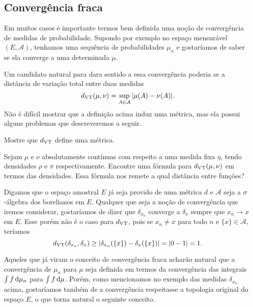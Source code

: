 \subsection{Convergência fraca}

Em muitos casos é importante termos bem definida uma noção de convergência de medidas de probabilidade.
Supondo por exemplo no espaço mensurável $(E,\mathcal{A})$, tenhamos uma sequência de probabilidades $\mu_n$ e gostaríamos de saber se ela converge a uma determinada $\mu$.

Um candidato natural para dara sentido a essa convergência poderia se a distância de variação total entre duas medidas
\begin{equation}
  d_{\operatorname{VT}}(\mu,\nu) = \sup_{A \in \mathcal{A}} |\mu(A) - \nu(A)|.
\end{equation}
Não é difícil mostrar que a definição acima induz uma métrica, mas ela possui alguns problemas que descreveremos a seguir.

\begin{exercise}
  Mostre que $d_{\operatorname{VT}}$ define uma métrica.
\end{exercise}

\begin{exercise}
  Sejam $\mu$ e $\nu$ absolutamente contínuas com respeito a uma medida fixa $\eta$, tendo densidades $\rho$ e $\pi$ respectivamente.
  Encontre uma fórmula para $d_{\operatorname{VT}}(\mu, \nu)$ em termos das densidades.
  Essa fórmula nos remete a qual distância entre funções?
\end{exercise}

Digamos que o espaço amostral $E$ já seja provido de uma métrica $d$ e $\mathcal{A}$ seja a $\sigma$-álgebra dos borelianos em $E$.
Qualquer que seja a noção de convergência que iremos considerar, gostaríamos de dizer que $\delta_{x_n}$ converge a $\delta_x$ sempre que $x_n \to x$ em $E$.
Esse porém não é o caso para $d_{\operatorname{VT}}$, pois se $x_n \neq x$ para todo $n$ e $\{x\} \in \mathcal{A}$, teríamos
\begin{equation}
  d_{\operatorname{VT}}(\delta_{x_n}, \delta_x) \geq |\delta_{x_n}(\{x\}) - \delta_{x}(\{x\}) | = |0 - 1| = 1.
\end{equation}

Aqueles que já viram o conceito de convergência fraca acharão natural que a convergência de $\mu_n$ para $\mu$ seja definida em termos da convergência das integrais $\int f \mathop{}\!\mathrm{d} \mu_n$ para $\int f \mathop{}\!\mathrm{d} \mu$.
Porém, como mencionamos no exemplo das medidas $\delta_{x_n}$ acima, gostaríamos também de a convergência respeitasse a topologia original do espaço $E$, o que torna natural o seguinte conceito.

